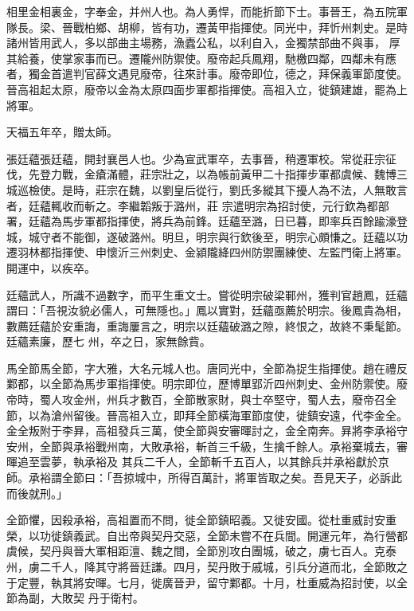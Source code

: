 \begin{pinyinscope}
 相里金相裏金，字奉金，并州人也。為人勇悍，而能折節下士。事晉王，為五院軍隊長。梁、晉戰柏鄉、胡柳，皆有功，遷黃甲指揮使。同光中，拜忻州刺史。是時諸州皆用武人，多以部曲主場務，漁蠹公私，以利自入，金獨禁部曲不與事，
 厚其給養，使掌家事而已。遷隴州防禦使。廢帝起兵鳳翔，馳檄四鄰，四鄰未有應者，獨金首遣判官薛文遇見廢帝，往來計事。廢帝即位，德之，拜保義軍節度使。晉高祖起太原，廢帝以金為太原四面步軍都指揮使。高祖入立，徙鎮建雄，罷為上將軍。



 天福五年卒，贈太師。



 張廷蘊張廷蘊，開封襄邑人也。少為宣武軍卒，去事晉，稍遷軍校。常從莊宗征伐，先登力戰，金瘡滿體，莊宗壯之，以為帳前黃甲二十指揮步軍都虞候、魏博三城巡檢使。是時，莊宗在魏，以劉皇后從行，劉氏多縱其下擾人為不法，人無敢言者，廷蘊輒收而斬之。李繼韜叛于潞州，莊
 宗遣明宗為招討使，元行欽為都部署，廷蘊為馬步軍都指揮使，將兵為前鋒。廷蘊至潞，日已暮，即率兵百餘踰濠登城，城守者不能御，遂破潞州。明旦，明宗與行欽後至，明宗心頗慊之。廷蘊以功遷羽林都指揮使、申懷沂三州刺史、金潁隴絳四州防禦團練使、左監門衛上將軍。開運中，以疾卒。



 廷蘊武人，所識不過數字，而平生重文士。嘗從明宗破梁鄆州，獲判官趙鳳，廷蘊謂曰：「吾視汝貌必儒人，可無隱也。」鳳以實對，廷蘊亟薦於明宗。後鳳貴為相，數薦廷蘊於安重誨，重誨屢言之，明宗以廷蘊破潞之隙，終恨之，故終不秉髦節。廷蘊素廉，歷七
 州，卒之日，家無餘貲。



 馬全節馬全節，字大雅，大名元城人也。唐同光中，全節為捉生指揮使。趙在禮反鄴都，以全節為馬步軍指揮使。明宗即位，歷博單郢沂四州刺史、金州防禦使。廢帝時，蜀人攻金州，州兵才數百，全節散家財，與士卒堅守，蜀人去，廢帝召全節，以為滄州留後。晉高祖入立，即拜全節橫海軍節度使，徙鎮安遠，代李金全。金全叛附于李昪，高祖發兵三萬，使全節與安審暉討之，金全南奔。昪將李承裕守安州，全節與承裕戰州南，大敗承裕，斬首三千級，生擒千餘人。承裕棄城去，審暉追至雲夢，執承裕及
 其兵二千人，全節斬千五百人，以其餘兵并承裕獻於京師。承裕謂全節曰：「吾掠城中，所得百萬計，將軍皆取之矣。吾見天子，必訴此而後就刑。」



 全節懼，因殺承裕，高祖置而不問，徙全節鎮昭義。又徙安國。從杜重威討安重榮，以功徙鎮義武。自出帝與契丹交惡，全節未嘗不在兵間。開運元年，為行營都虞候，契丹與晉大軍相距澶、魏之間，全節別攻白團城，破之，虜七百人。克泰州，虜二千人，降其守將晉廷謙。四月，契丹敗于戚城，引兵分道而北，全節敗之于定豐，執其將安暉。七月，徙廣晉尹，留守鄴都。十月，杜重威為招討使，以全節為副，大敗契
 丹于衛村。




\end{pinyinscope}

